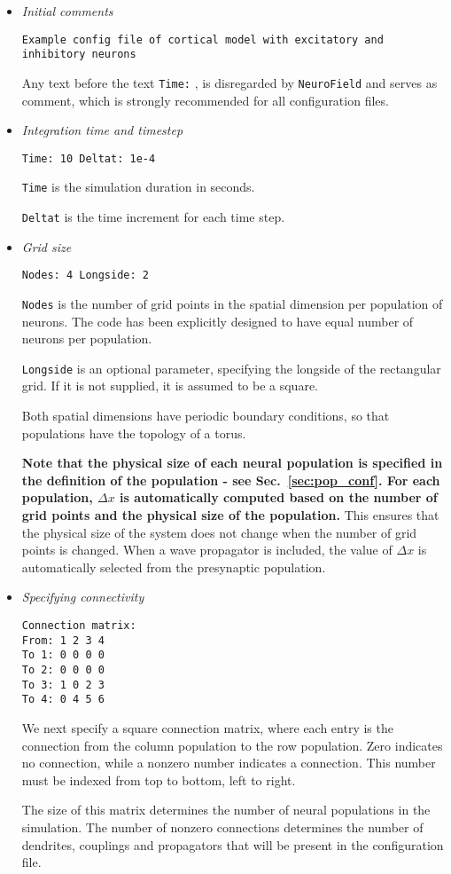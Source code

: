 \documentclass[12pt,a4paper]{article}
\newcommand{\type}[1]{{\small\small\tt #1} }
\newcommand{\NF}[0]{\type{NeuroField}}
\begin{document}
\begin{itemize}
\item {\em Initial comments}
\begin{lstlisting}
Example config file of cortical model with excitatory and inhibitory neurons
\end{lstlisting}
Any text before the text \type{Time:}, is disregarded by \NF and serves as comment, which is strongly recommended for all configuration files.
\item  {\em Integration time and timestep}
\begin{lstlisting}
Time: 10 Deltat: 1e-4
\end{lstlisting}
\type{Time} is the simulation duration in seconds.

\type{Deltat} is the time increment for each time step.
\item  {\em Grid size}
\begin{lstlisting}
Nodes: 4 Longside: 2
\end{lstlisting}
\type{Nodes} is the number of grid points in the spatial dimension per population of neurons. The code has been explicitly designed to have equal number of neurons per population.

\type{Longside} is an optional parameter, specifying the longside of the rectangular grid. If it is not supplied, it is assumed to be a square.

Both spatial dimensions have periodic boundary conditions, so that populations have the topology of a torus.

{\bf Note that the physical size of each neural population is specified in the definition of the population - see Sec.~\ref{sec:pop_conf}. For each population, $\Delta x$ is automatically computed based on the number of grid points and the physical size of the population.} This ensures that the physical size of the system does not change when the number of grid points is changed. When a wave propagator is included, the value of $\Delta x$ is automatically selected from the presynaptic population.

\item {\em Specifying connectivity}
\begin{lstlisting}
Connection matrix:
From: 1 2 3 4
To 1: 0 0 0 0
To 2: 0 0 0 0
To 3: 1 0 2 3
To 4: 0 4 5 6
\end{lstlisting}
We next specify a square connection matrix, where each entry is the connection from the column population to the row population. Zero indicates no connection, while a nonzero number indicates a connection. This number must be indexed from top to bottom, left to right.

The size of this matrix determines the number of neural populations in the simulation. The number of nonzero connections determines the number of dendrites, couplings and propagators that will be present in the configuration file.
\end{itemize}
\end{document}

